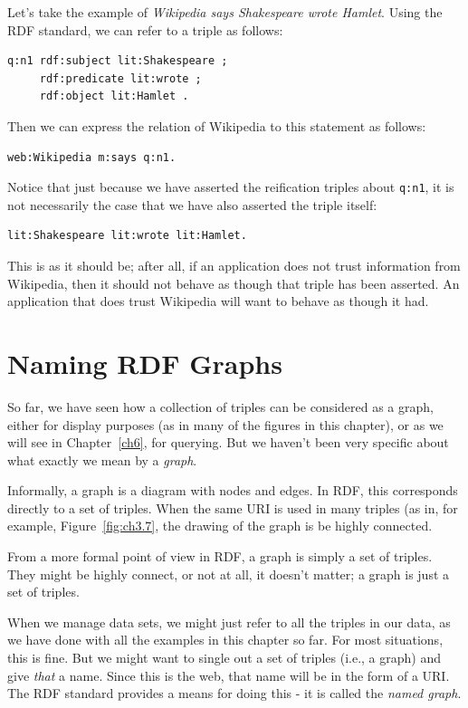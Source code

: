 Let's take the example of \emph{Wikipedia says Shakespeare wrote
Hamlet}. Using the RDF standard, we can refer to a triple as follows:

\begin{lstlisting}
q:n1 rdf:subject lit:Shakespeare ; 
     rdf:predicate lit:wrote ; 
     rdf:object lit:Hamlet .
\end{lstlisting}

Then we can express the relation of Wikipedia to this statement as
follows:

\begin{lstlisting}
web:Wikipedia m:says q:n1.
\end{lstlisting}

Notice that just because we have asserted the reification triples about
\texttt{q:n1}, it is not necessarily the case that we have also asserted the
triple itself:

\begin{lstlisting}
lit:Shakespeare lit:wrote lit:Hamlet.
\end{lstlisting}

This is as it should be; after all, if an application does not trust
information from Wikipedia, then it should not behave as though that
triple has been asserted. An application that does trust Wikipedia will
want to behave as though it had.


\section{Naming RDF Graphs}
So far, we have seen how a collection of triples can be considered as a graph,
either for display purposes (as in many of the figures in this chapter), or as we will
see in Chapter~\ref{ch6}, for querying.  But we haven't been very
specific about what exactly we mean by a \emph{graph}.

Informally, a graph is a diagram with nodes and edges.  In RDF, this
corresponds directly to a set of triples.  When the same URI is used in
many triples (as in, for example, Figure~\ref{fig:ch3.7}, the drawing
of the graph is be highly connected.

From a more formal point of view in RDF, a graph is simply a set of
triples. They might be highly connect, or not at all, it doesn't
matter; a graph is just a set of triples.

When we manage data sets, we might just refer to all the triples in
our data, as we have done with all the examples in this chapter so
far.  For most situations, this is fine.  But we might want to single
out a set of triples (i.e., a graph) and give \emph{that} a name.
Since this is the web, that name will be in the form of a URI.  The
RDF standard provides a means for doing this - it is called the
\emph{named graph}.

